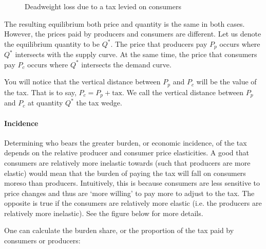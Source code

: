 \documentclass[letterpaper,10pt,english]{jupyterBook}
\let\sphinxpxdimen\pdfpxdimen\else\newdimen\sphinxpxdimen
\begin{document}
\begin{figure}[htbp]
\centering
\capstart

\noindent\sphinxincludegraphics[width=500\sphinxpxdimen]{{fig4-dwl-tax-wedge}.png}
\caption{Deadweight loss due to a tax levied on consumers}\label{\detokenize{content/03-public/taxes-subsidies:dwl-tax-wedge}}\end{figure}

\sphinxAtStartPar
The resulting equilibrium \sphinxhyphen{} both price and quantity \sphinxhyphen{} is the same in both cases. However, the prices paid by producers and consumers are different. Let us denote the equilibrium quantity to be \(Q^*\). The price that producers pay \(P_p\) occurs where \(Q^*\) intersects with the supply curve. At the same time, the price that consumers pay \(P_c\) occurs where \(Q^*\) intersects  the demand curve.

\sphinxAtStartPar
You will notice that the vertical distance between \(P_p\) and \(P_c\) will be the value of the tax. That is to say, \(P_c = P_p + \text{tax}\). We call the vertical distance between \(P_p\) and \(P_c\) at quantity \(Q^*\) the tax wedge.


\paragraph{Incidence}
\label{\detokenize{content/03-public/taxes-subsidies:incidence}}
\sphinxAtStartPar
Determining who bears the greater burden, or economic incidence, of the tax depends on the relative producer and consumer price elasticities. A good that consumers are relatively more inelastic towards (such that producers are more elastic) would mean that the burden of paying the tax will fall on consumers moreso than producers. Intuitively, this is because consumers are less sensitive to price changes and thus are ‘more willing’ to pay more to adjust to the tax. The opposite is true if the consumers are relatively more elastic (i.e. the producers are relatively more inelastic). See the figure below for more details.

\sphinxAtStartPar
One can calculate the burden share, or the proportion of the tax paid by consumers or producers:
\end{document}
